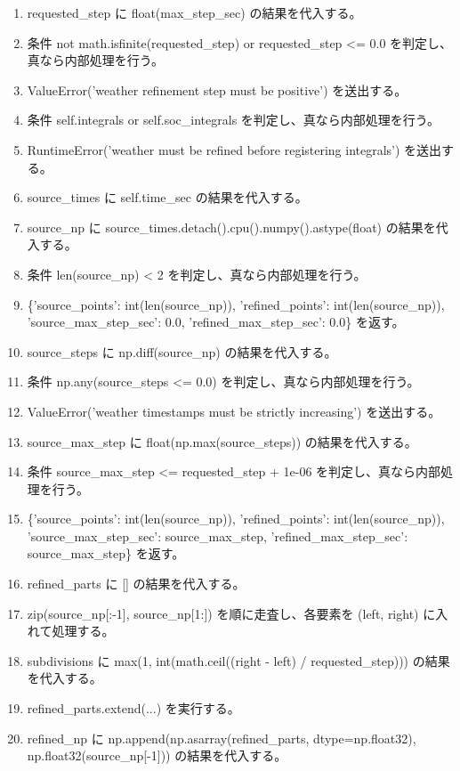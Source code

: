 \documentclass[a4paper,11pt]{article}
\begin{document}
            \begin{enumerate}[leftmargin=1.8em]
            \item requested\_step に float(max\_step\_sec) の結果を代入する。
\item 条件 not math.isfinite(requested\_step) or requested\_step <= 0.0 を判定し、真なら内部処理を行う。
\item   ValueError('weather refinement step must be positive') を送出する。
\item 条件 self.integrals or self.soc\_integrals を判定し、真なら内部処理を行う。
\item   RuntimeError('weather must be refined before registering integrals') を送出する。
\item source\_times に self.time\_sec の結果を代入する。
\item source\_np に source\_times.detach().cpu().numpy().astype(float) の結果を代入する。
\item 条件 len(source\_np) < 2 を判定し、真なら内部処理を行う。
\item   \{'source\_points': int(len(source\_np)), 'refined\_points': int(len(source\_np)), 'source\_max\_step\_sec': 0.0, 'refined\_max\_step\_sec': 0.0\} を返す。
\item source\_steps に np.diff(source\_np) の結果を代入する。
\item 条件 np.any(source\_steps <= 0.0) を判定し、真なら内部処理を行う。
\item   ValueError('weather timestamps must be strictly increasing') を送出する。
\item source\_max\_step に float(np.max(source\_steps)) の結果を代入する。
\item 条件 source\_max\_step <= requested\_step + 1e-06 を判定し、真なら内部処理を行う。
\item   \{'source\_points': int(len(source\_np)), 'refined\_points': int(len(source\_np)), 'source\_max\_step\_sec': source\_max\_step, 'refined\_max\_step\_sec': source\_max\_step\} を返す。
\item refined\_parts に [] の結果を代入する。
\item zip(source\_np[:-1], source\_np[1:]) を順に走査し、各要素を (left, right) に入れて処理する。
\item   subdivisions に max(1, int(math.ceil((right - left) / requested\_step))) の結果を代入する。
\item   refined\_parts.extend(...) を実行する。
\item refined\_np に np.append(np.asarray(refined\_parts, dtype=np.float32), np.float32(source\_np[-1])) の結果を代入する。

\end{enumerate}
\end{document}
